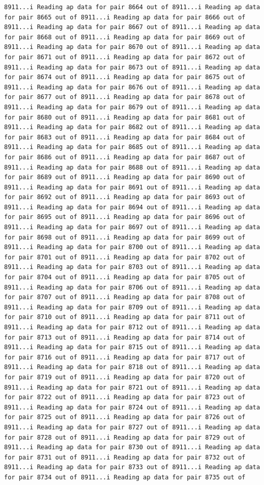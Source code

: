 \documentclass[
]{article}
\begin{document}
\begin{verbatim}
8911...i Reading ap data for pair 8664 out of 8911...i Reading ap data for pair 8665 out of 8911...i Reading ap data for pair 8666 out of 8911...i Reading ap data for pair 8667 out of 8911...i Reading ap data for pair 8668 out of 8911...i Reading ap data for pair 8669 out of 8911...i Reading ap data for pair 8670 out of 8911...i Reading ap data for pair 8671 out of 8911...i Reading ap data for pair 8672 out of 8911...i Reading ap data for pair 8673 out of 8911...i Reading ap data for pair 8674 out of 8911...i Reading ap data for pair 8675 out of 8911...i Reading ap data for pair 8676 out of 8911...i Reading ap data for pair 8677 out of 8911...i Reading ap data for pair 8678 out of 8911...i Reading ap data for pair 8679 out of 8911...i Reading ap data for pair 8680 out of 8911...i Reading ap data for pair 8681 out of 8911...i Reading ap data for pair 8682 out of 8911...i Reading ap data for pair 8683 out of 8911...i Reading ap data for pair 8684 out of 8911...i Reading ap data for pair 8685 out of 8911...i Reading ap data for pair 8686 out of 8911...i Reading ap data for pair 8687 out of 8911...i Reading ap data for pair 8688 out of 8911...i Reading ap data for pair 8689 out of 8911...i Reading ap data for pair 8690 out of 8911...i Reading ap data for pair 8691 out of 8911...i Reading ap data for pair 8692 out of 8911...i Reading ap data for pair 8693 out of 8911...i Reading ap data for pair 8694 out of 8911...i Reading ap data for pair 8695 out of 8911...i Reading ap data for pair 8696 out of 8911...i Reading ap data for pair 8697 out of 8911...i Reading ap data for pair 8698 out of 8911...i Reading ap data for pair 8699 out of 8911...i Reading ap data for pair 8700 out of 8911...i Reading ap data for pair 8701 out of 8911...i Reading ap data for pair 8702 out of 8911...i Reading ap data for pair 8703 out of 8911...i Reading ap data for pair 8704 out of 8911...i Reading ap data for pair 8705 out of 8911...i Reading ap data for pair 8706 out of 8911...i Reading ap data for pair 8707 out of 8911...i Reading ap data for pair 8708 out of 8911...i Reading ap data for pair 8709 out of 8911...i Reading ap data for pair 8710 out of 8911...i Reading ap data for pair 8711 out of 8911...i Reading ap data for pair 8712 out of 8911...i Reading ap data for pair 8713 out of 8911...i Reading ap data for pair 8714 out of 8911...i Reading ap data for pair 8715 out of 8911...i Reading ap data for pair 8716 out of 8911...i Reading ap data for pair 8717 out of 8911...i Reading ap data for pair 8718 out of 8911...i Reading ap data for pair 8719 out of 8911...i Reading ap data for pair 8720 out of 8911...i Reading ap data for pair 8721 out of 8911...i Reading ap data for pair 8722 out of 8911...i Reading ap data for pair 8723 out of 8911...i Reading ap data for pair 8724 out of 8911...i Reading ap data for pair 8725 out of 8911...i Reading ap data for pair 8726 out of 8911...i Reading ap data for pair 8727 out of 8911...i Reading ap data for pair 8728 out of 8911...i Reading ap data for pair 8729 out of 8911...i Reading ap data for pair 8730 out of 8911...i Reading ap data for pair 8731 out of 8911...i Reading ap data for pair 8732 out of 8911...i Reading ap data for pair 8733 out of 8911...i Reading ap data for pair 8734 out of 8911...i Reading ap data for pair 8735 out of 
\end{verbatim}
\end{document}
